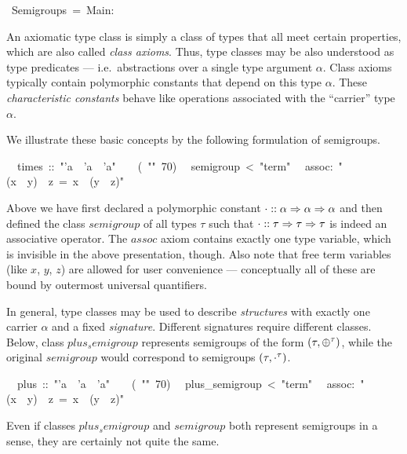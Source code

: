 \begin{isabelle}%
%
\ Semigroups\ =\ Main:%
\begin{isamarkuptext}%
\medskip\noindent An axiomatic type class is simply a class of types
 that all meet certain properties, which are also called \emph{class
 axioms}. Thus, type classes may be also understood as type predicates
 --- i.e.\ abstractions over a single type argument $\alpha$.  Class
 axioms typically contain polymorphic constants that depend on this
 type $\alpha$.  These \emph{characteristic constants} behave like
 operations associated with the ``carrier'' type $\alpha$.

 We illustrate these basic concepts by the following formulation of
 semigroups.%
\end{isamarkuptext}%
\isanewline
\ \ times\ ::\ {"}'a\ {\isasymRightarrow}\ 'a\ {\isasymRightarrow}\ 'a{"}\ \ \ \ (\ {"}{\isasymOtimes}{"}\ 70)\isanewline
{}\isanewline
\ \ semigroup\ <\ {"}term{"}\isanewline
\ \ assoc:\ {"}(x\ {\isasymOtimes}\ y)\ {\isasymOtimes}\ z\ =\ x\ {\isasymOtimes}\ (y\ {\isasymOtimes}\ z){"}%
\begin{isamarkuptext}%
\noindent Above we have first declared a polymorphic constant $\cdot
 :: \alpha \Rightarrow \alpha \Rightarrow \alpha$ and then defined the class
 $semigroup$ of all types $\tau$ such that $\cdot :: \tau \Rightarrow \tau
 \Rightarrow \tau$ is indeed an associative operator.  The $assoc$ axiom
 contains exactly one type variable, which is invisible in the above
 presentation, though.  Also note that free term variables (like $x$,
 $y$, $z$) are allowed for user convenience --- conceptually all of
 these are bound by outermost universal quantifiers.

 \medskip In general, type classes may be used to describe
 \emph{structures} with exactly one carrier $\alpha$ and a fixed
 \emph{signature}.  Different signatures require different classes.
 Below, class $plus_semigroup$ represents semigroups of the form
 $(\tau, \oplus^\tau)$, while the original $semigroup$ would correspond
 to semigroups $(\tau, \cdot^\tau)$.%
\end{isamarkuptext}%
\isanewline
\ \ plus\ ::\ {"}'a\ {\isasymRightarrow}\ 'a\ {\isasymRightarrow}\ 'a{"}\ \ \ \ (\ {"}{\isasymOplus}{"}\ 70)\isanewline
{}\isanewline
\ \ plus\_semigroup\ <\ {"}term{"}\isanewline
\ \ assoc:\ {"}(x\ {\isasymOplus}\ y)\ {\isasymOplus}\ z\ =\ x\ {\isasymOplus}\ (y\ {\isasymOplus}\ z){"}%
\begin{isamarkuptext}%
\noindent Even if classes $plus_semigroup$ and $semigroup$ both
 represent semigroups in a sense, they are certainly not quite the
 same.%
\end{isamarkuptext}%
\end{isabelle}%
